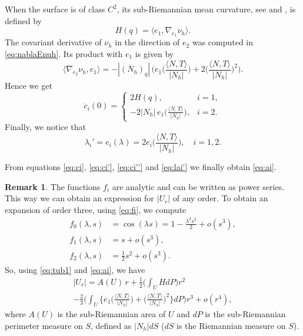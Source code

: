 \documentclass[10pt]{amsart}
\theoremstyle{definition}
\newtheorem{remark}[theorem]{Remark}
\theoremstyle{remark}
\numberwithin{equation}{section}
\begin{document}
When the surface is of class $C^2$, its sub-Riemannian mean curvature, see \cite{MR2435652} and \cite{MR2898770}, is defined by
\[
H(q)={\langle{e_1,\nabla_{e_1}{\nu_{h}}}\rangle}.
\]
The covariant derivative of ${\nu_{h}}$ in the direction of $e_2$ was computed in \eqref{eq:nablaEnuh}. Its product with $e_1$ is given by
\[
{\langle{\nabla_{e_2}{\nu_{h}},e_1}\rangle}=-|(N_h)_q|\,\bigg(e_1\bigg({\frac{{\langle{N,T}\rangle}}{|N_h|}}\bigg)+2\bigg({\frac{{\langle{N,T}\rangle}}{|N_h|}}\bigg)^2\bigg).
\]
Hence we get
\begin{equation}
\label{eq:ci''}
\ddot{c}_{i}(0)=\begin{cases}
2H(q), & i=1,
\\
-2|N_h|\,e_1\big({\frac{{\langle{N,T}\rangle}}{|N_h|}}\big),
&i=2.
\end{cases}
\end{equation}
Finally, we notice that
\begin{equation}
\label{eq:lai'}
{\lambda}_{i}'=e_i({\lambda})=2e_i\bigg(\frac{{\langle{N,T}\rangle}}{|N_h|}\bigg), \quad i=1,2.
\end{equation}

From equations \eqref{eq:ci}, \eqref{eq:ci'}, \eqref{eq:ci''} and \eqref{eq:lai'} we finally obtain \eqref{eq:ai}.

\begin{remark}
The functions $f_i$ are analytic and can be written as power series. This way we can obtain an expression for $|U_r|$ of any order. To obtain an expansion of order three, using \eqref{eq:fi}, we compute
\begin{align*}
f_0({\lambda},s)&=\cos({\lambda} s)=1-\frac{{\lambda}^2s^2}{2}+o(s^3),
\\
f_1({\lambda},s)&=s+o(s^3),
\\
f_2({\lambda},s)&=\frac{1}{2}s^2+o(s^3).
\end{align*}
So, using \eqref{eq:tub1} and \eqref{eq:ai}, we have
\begin{multline}
\label{eq:power3}
|U_r|=A(U)\,r+\frac{1}{2}\bigg(\int_UHdP\bigg)r^2
\\
-\frac{2}{3}\bigg(\int_U\bigg\{e_1\bigg({\frac{{\langle{N,T}\rangle}}{|N_h|}}\bigg)+\bigg({\frac{{\langle{N,T}\rangle}}{|N_h|}}\bigg)^2\bigg\}dP\bigg)r^3+o(r^4),
\end{multline}
where $A(U)$ is the sub-Riemannian area of $U$ and $dP$ is the sub-Riemannian perimeter measure on $S$, defined as $|N_h|dS$ ($dS$ is the Riemannian measure on $S$).
\end{remark}
\end{document}

